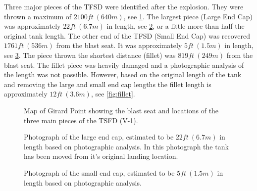 \documentclass[10pt,parskip=half,
toc=sectionentrywithdots,
bibliography=totocnumbered,
captions=tableheading,numbers=noendperiod]{scrartcl}
\begin{document}
Three major pieces of the TFSD were identified after the explosion. They
were thrown a maximum of \(2100ft\:(640m)\), see
\cref{fig:blast_debris}. The largest piece (Large End Cap) was
approximately \(22ft\:(6.7m)\) in length, see \cref{fig:large_end_cap},
or a little more than half the original tank length. The other end of
the TFSD (Small End Cap) was recovered \(1761ft\:(536m)\) from the blast
seat. It was approximately \(5ft\:(1.5m)\) in length, see
\cref{fig:small_end_cap}. The piece thrown the shortest distance
(fillet) was \(819ft\:(249m)\) from the blast seat. The fillet piece was
heavily damaged and a photographic analysis of the length was not
possible. However, based on the original length of the tank and removing
the large and small end cap lengths the fillet length is approximately
\(12ft\:(3.6m)\), see \cref{fig:fillet}.

\begin{figure}[H]
\hypertarget{fig:blast_debris}{%
\begin{center}
\end{center}
\caption{Map of Girard Point showing the blast seat and locations of the three
main pieces of the TSFD (V-1).\cite{Malone2019a}}\label{fig:blast_debris}
}
\end{figure}

\begin{figure}[H]
\hypertarget{fig:large_end_cap}{%
\begin{center}
\end{center}
\caption{Photograph of the large end cap, estimated to be \(22ft\:(6.7m)\) in
length based on photographic analysis. In this photograph the tank has
been moved from it's original landing location.\cite{Malone2019a}}\label{fig:large_end_cap}
}
\end{figure}

\begin{figure}[H]
\hypertarget{fig:small_end_cap}{%
\begin{center}
\end{center}
\caption{Photograph of the small end cap, estimated to be \(5ft\:(1.5m)\) in
length based on photographic analysis.\cite{Malone2019a}}\label{fig:small_end_cap}
}
\end{figure}
\end{document}
